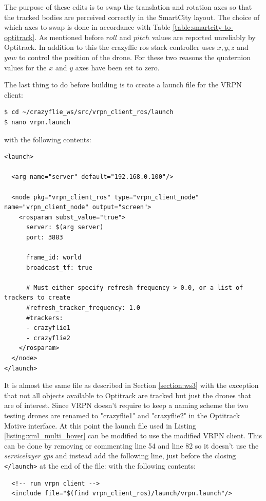 \noindent The purpose of these edits is to swap the translation and rotation axes so that the tracked bodies are perceived correctly in the SmartCity layout. The choice of which axes to swap is done in accordance with Table \ref{table:smartcity-to-optitrack}. As mentioned before $roll$ and $pitch$ values are reported unreliably by Optitrack. In addition to this the crazyflie ros stack controller uses $x, y, z$ and $yaw$ to control the position of the drone. For these two reasons the quaternion values for the $x$ and $y$ axes have been set to zero.

\noindent The last thing to do before building is to create a launch file for the VRPN client:
\begin{verbatim}
$ cd ~/crazyflie_ws/src/vrpn_client_ros/launch
$ nano vrpn.launch
\end{verbatim}

\noindent with the following contents:
\begin{verbatim}
<launch>

  <arg name="server" default="192.168.0.100"/>

  <node pkg="vrpn_client_ros" type="vrpn_client_node" name="vrpn_client_node" output="screen">
    <rosparam subst_value="true">
      server: $(arg server)
      port: 3883

      frame_id: world
      broadcast_tf: true

      # Must either specify refresh frequency > 0.0, or a list of trackers to create
      #refresh_tracker_frequency: 1.0
      #trackers:
      - crazyflie1
      - crazyflie2
    </rosparam>
  </node>
</launch>
\end{verbatim}

\noindent It is almost the same file as described in Section \ref{section:ws3} with the exception that not all objects available to Optitrack are tracked but just the drones that are of interest. Since VRPN doesn't require to keep a naming scheme the two testing drones are renamed to "crazyflie1" and "crazyflie2" in the Optitrack Motive interface.
At this point the launch file used in Listing \ref{listing:xml_multi_hover} can be modified to use the modified VRPN client. This can be done by removing or commenting line 54 and line 82 so it doesn't use the \textit{servicelayer gps} and instead add the following line, just before the closing \texttt{</launch>} at the end of the file:
\noindent with the following contents:
\begin{verbatim}
  <!-- run vrpn client -->
  <include file="$(find vrpn_client_ros)/launch/vrpn.launch"/>
\end{verbatim}

